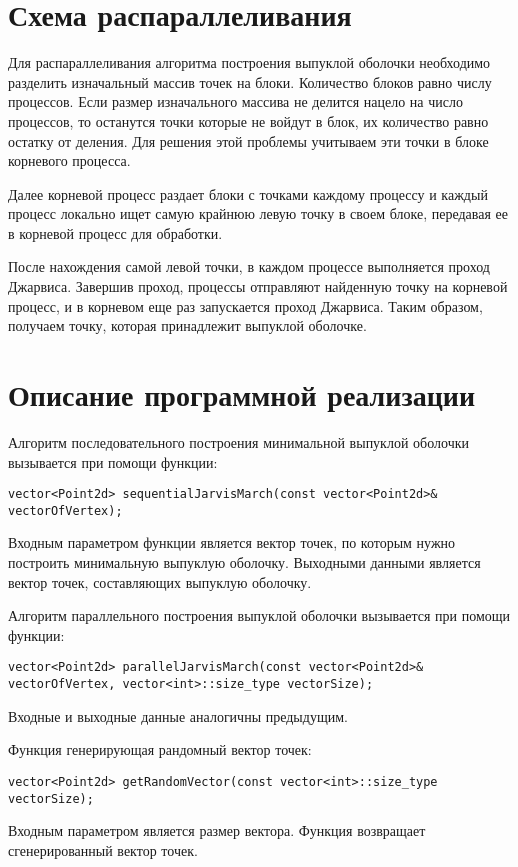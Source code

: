 \documentclass{report}
\begin{document}
\section*{Схема распараллеливания}
Для распараллеливания алгоритма построения выпуклой оболочки необходимо разделить изначальный массив точек на блоки. Количество блоков равно числу процессов. Если размер изначального массива не делится нацело на число процессов, то останутся точки которые не войдут в блок, их количество равно остатку от деления. Для решения этой проблемы учитываем эти точки в блоке корневого процесса.
\par
Далее корневой процесс раздает блоки с точками каждому процессу и каждый процесс локально ищет самую крайнюю левую точку в своем блоке, передавая ее в корневой процесс для обработки.
\par
После нахождения самой левой точки, в каждом процессе выполняется проход Джарвиса. Завершив проход, процессы отправляют найденную точку на корневой процесс, и в корневом еще раз запускается проход Джарвиса. Таким образом, получаем точку, которая принадлежит выпуклой оболочке.  
\newpage

\section*{Описание программной реализации}
Алгоритм последовательного построения минимальной выпуклой оболочки вызывается при помощи функции:
\begin{lstlisting}
vector<Point2d> sequentialJarvisMarch(const vector<Point2d>& vectorOfVertex);
\end{lstlisting}
\par Входным параметром функции является вектор точек, по которым нужно построить минимальную выпуклую оболочку. Выходными данными является вектор точек, составляющих выпуклую оболочку.
\par Алгоритм параллельного построения выпуклой оболочки вызывается при помощи функции:
\begin{lstlisting}
vector<Point2d> parallelJarvisMarch(const vector<Point2d>& vectorOfVertex, vector<int>::size_type vectorSize);
\end{lstlisting}
\par Входные и выходные данные аналогичны предыдущим.
\par Функция генерирующая рандомный вектор точек:
\begin{lstlisting}
vector<Point2d> getRandomVector(const vector<int>::size_type vectorSize);
\end{lstlisting}
\par Входным параметром является размер вектора. Функция возвращает сгенерированный вектор точек.
\newpage
\end{document}
